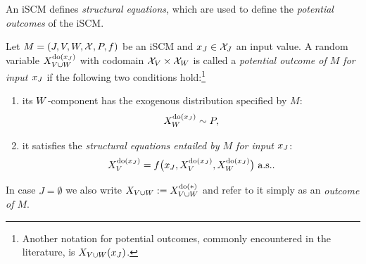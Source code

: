 An iSCM defines \emph{structural equations}, which are used to define the \emph{potential outcomes} of the iSCM.
\begin{Def}\label{def:scm_solutions_for_inputs}
  Let $M = \left ( J, V, W, \mathcal{X}, P, f \right )$ be an iSCM
  and $x_{J} \in \mathcal{X}_{J}$ an input value.
  A random variable $X_{V \cup W}^{\operatorname{do}(x_{J})}$ with codomain $\mathcal{X}_{V} \times \mathcal{X}_{W}$ is called
  a \emph{potential outcome of $M$ for input $x_{J}$} 
  if the following two conditions hold:\footnote{Another notation for potential outcomes, commonly encountered in the literature, is $X_{V\cup W}(x_{J})$.}
    \begin{enumerate}
      \item its $W$-component has the exogenous distribution specified by $M$: 
        $$X_{W}^{\operatorname{do}(x_{J})} \sim P,$$
      \item it satisfies the \emph{structural equations entailed by $M$ for input $x_{J}$}:
        \begin{equation}\label{eq:cscm_structural_equations}
          X_{V}^{\operatorname{do}(x_{J})} = f\big(x_{J}, X_{V}^{\operatorname{do}(x_{J})}, X_{W}^{\operatorname{do}(x_{J})}\big) \text{ a.s.}.
        \end{equation}
    \end{enumerate}
  In case $J = \emptyset$ we also write $X_{V \cup W} := X_{V \cup W}^{\operatorname{do}(*)}$ and refer to it simply as an \emph{outcome of $M$}.
\end{Def}

